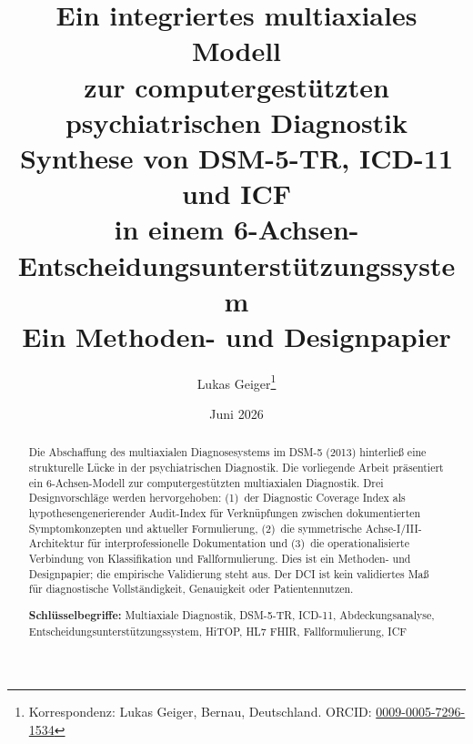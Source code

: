 \documentclass[11pt,a4paper]{article}
\begin{document}

\title{\textbf{\huge Ein integriertes multiaxiales Modell\\zur computergest\"utzten psychiatrischen Diagnostik}\\[0.5em]
\Large Synthese von DSM-5-TR, ICD-11 und ICF\\in einem 6-Achsen-Entscheidungsunterst\"utzungssystem\\[0.3em]
\large Ein Methoden- und Designpapier}

\author[1]{Lukas Geiger\thanks{Korrespondenz: Lukas Geiger, Bernau, Deutschland. ORCID: \href{https://orcid.org/0009-0005-7296-1534}{0009-0005-7296-1534}}}

\date{Juni 2026}

\maketitle

\begin{abstract}
\noindent Die Abschaffung des multiaxialen Diagnosesystems im DSM-5 (2013) hinterlie\ss{} eine strukturelle L\"ucke in der psychiatrischen Diagnostik. Die vorliegende Arbeit pr\"asentiert ein 6-Achsen-Modell zur computergest\"utzten multiaxialen Diagnostik. Drei Designvorschl\"age werden hervorgehoben: (1)~der Diagnostic Coverage Index als hypothesengenerierender Audit-Index f\"ur Verkn\"upfungen zwischen dokumentierten Symptomkonzepten und aktueller Formulierung, (2)~die symmetrische Achse-I/III-Architektur f\"ur interprofessionelle Dokumentation und (3)~die operationalisierte Verbindung von Klassifikation und Fallformulierung. Dies ist ein Methoden- und Designpapier; die empirische Validierung steht aus. Der DCI ist kein validiertes Ma\ss{} f\"ur diagnostische Vollst\"andigkeit, Genauigkeit oder Patientennutzen.

\vspace{0.5em}
\noindent \textbf{Schl\"usselbegriffe:} Multiaxiale Diagnostik, DSM-5-TR, ICD-11, Abdeckungsanalyse, Entscheidungsunterst\"utzungssystem, HiTOP, HL7 FHIR, Fallformulierung, ICF
\end{abstract}

\newpage
\begingroup
\footnotesize
{}
\setlength{\parskip}{0pt}
\tableofcontents
\endgroup

\end{document}
